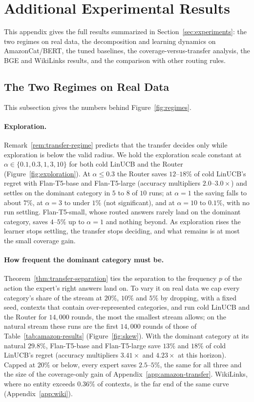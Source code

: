 \documentclass[anon]{alt2027} %
\begin{document}
\section{Additional Experimental Results}
\label{app:more-exp}

This appendix gives the full results summarized in Section~\ref{sec:experiments}:
the two regimes on real data, the decomposition and learning dynamics on
AmazonCat/BERT, the tuned baselines, the coverage-versus-transfer analysis,
the BGE and WikiLinks results, and the comparison with other routing rules.

\subsection{The Two Regimes on Real Data}
\label{app:main-details}

This subsection gives the numbers behind Figure~\ref{fig:regimes}.

\paragraph{Exploration.} Remark~\ref{rem:transfer-regime}
predicts that the transfer decides only while exploration is below the valid
radius. We hold the exploration scale constant at
$\alpha\in\{0.1,0.3,1,3,10\}$ for both cold LinUCB and the Router
(Figure~\ref{fig:exploration}). At $\alpha\le0.3$ the Router saves $12$--$18\%$
of cold LinUCB's regret with Flan-T5-base and Flan-T5-large (accuracy
multipliers $2.0$--$3.0\times$) and settles on the dominant category in $5$ to
$8$ of $10$ runs; at $\alpha=1$ the saving falls to about $7\%$, at $\alpha=3$
to under $1\%$ (not significant), and at $\alpha=10$ to $0.1\%$, with no run
settling. Flan-T5-small, whose routed answers rarely land on the dominant
category, saves $4$--$5\%$ up to $\alpha=1$ and nothing beyond. As
exploration rises the learner stops settling, the transfer stops deciding,
and what remains is at most the small coverage gain.

\paragraph{How frequent the dominant category must be.}
Theorem~\ref{thm:transfer-separation} ties the separation to the frequency
$p$ of the action the expert's right answers land on. To vary it on real
data we cap every category's share of the stream at $20\%$, $10\%$ and $5\%$
by dropping, with a fixed seed, contexts that contain over-represented
categories, and run cold LinUCB and the Router for $14{,}000$ rounds, the most
the smallest stream allows; on the natural stream these runs are the first
$14{,}000$ rounds of those of Table~\ref{tab:amazon-results}
(Figure~\ref{fig:skew}). With the dominant category at its natural $29.8\%$,
Flan-T5-base and Flan-T5-large save $13\%$ and $18\%$ of cold LinUCB's regret
(accuracy multipliers $3.41\times$ and $4.23\times$ at this horizon). Capped at
$20\%$ or below, every expert saves $2.5$--$5\%$, the same for all three and
the size of the coverage-only gain of Appendix~\ref{app:amazon-transfer}.
WikiLinks, where no entity exceeds $0.36\%$ of contexts, is the far end of the
same curve (Appendix~\ref{app:wiki}).
\end{document}
